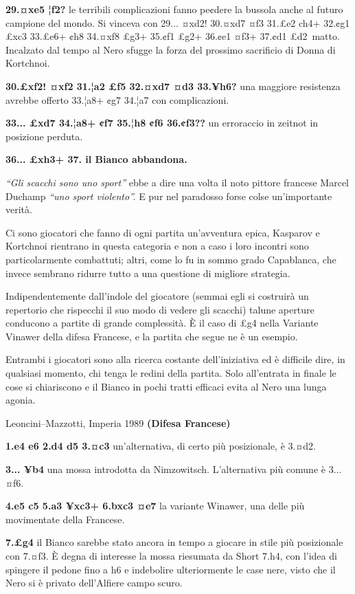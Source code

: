 \textbf{29.¤xe5 ¦f2?} le terribili complicazioni fanno pe¢dere la
bussola anche al futuro campione del mondo. Si vinceva con 29... ¤xd2!
30.¤xd7 ¤f3 31.£e2 ch4+ 32.¢g1 £xc3 33.£e6+ ¢h8 34.¤xf8 £g3+ 35.¢f1 £g2+
36.¢e1 ¤f3+ 37.¢d1 £d2~matto. Incalzato dal tempo al Nero sfugge la
forza del prossimo sacrificio di Donna di Kortchnoi.

\textbf{30.£xf2! ¤xf2 31.¦a2 £f5 32.¤xd7 ¤d3 33.¥h6?} una maggiore
resistenza avrebbe offerto 33.¦a8+ ¢g7 34.¦a7 con complicazioni.

\textbf{33... £xd7 34.¦a8+ ¢f7 35.¦h8 ¢f6 36.¢f3??} un erroraccio in
zeitnot in posizione perduta.

\textbf{36... £xh3+ 37. il Bianco abbandona.}

\emph{``Gli scacchi sono uno sport''} ebbe a dire una volta il noto
pittore francese Marcel Duchamp \emph{``uno sport violento''.} E pur nel
paradosso forse colse un'importante verità.

Ci sono giocatori che fanno di ogni partita un'avventura epica, Kasparov
e Kortchnoi rientrano in questa categoria e non a caso i loro incontri
sono particolarmente combattuti; altri, come lo fu in sommo grado
Capablanca, che invece sembrano ridurre tutto a una questione di
migliore strategia.

Indipendentemente dall'indole del giocatore (semmai egli si costruirà un
repertorio che rispecchi il suo modo di vedere gli scacchi) talune
aperture conducono a partite di grande complessità. È il caso di £g4
nella Variante Vinawer della difesa Francese, e la partita che segue ne
è un esempio.

Entrambi i giocatori sono alla ricerca costante dell'iniziativa ed è
difficile dire, in qualsiasi momento, chi tenga le redini della partita.
Solo all'entrata in finale le cose si chiariscono e il Bianco in pochi
tratti efficaci evita al Nero una lunga agonia.

Leoncini--Mazzotti, Imperia 1989 \textbf{(Difesa Francese)}

\textbf{1.e4 e6 2.d4 d5 3.¤c3} un'alternativa, di certo più posizionale,
è 3.¤d2.

\textbf{3... ¥b4} una mossa introdotta da Nimzowitsch. L'alternativa più
comune è 3... ¤f6.

\textbf{4.e5 c5 5.a3 ¥xc3+ 6.bxc3 ¤e7} la variante Winawer, una delle
più movimentate della Francese.

\textbf{7.£g4} il Bianco sarebbe stato ancora in tempo a giocare in
stile più posizionale con 7.¤f3. È degna di interesse la mossa riesumata
da Short 7.h4, con l'idea di spingere il pedone fino a h6 e indebolire
ulteriormente le case nere, visto che il Nero si è privato dell'Alfiere
campo scuro.

